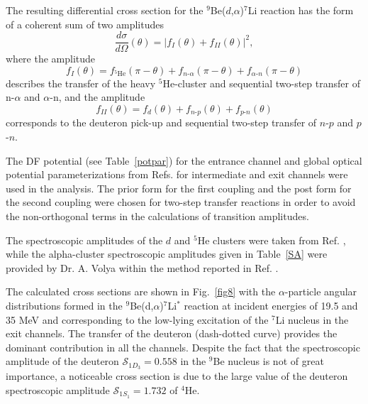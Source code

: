 \documentclass[
11pt, %
english, %
onehalfspacing, %
headsepline, %
]{MastersDoctoralThesis} %
\begin{document}
The resulting differential cross section for the ${^9}$Be($d$,$\alpha$)${}^7$Li reaction has the form of a coherent sum of two amplitudes
\begin{equation}
\frac{d\sigma}{d\Omega}(\theta) =\vert f_{I}(\theta) + f_{II}(\theta) \vert ^2,
\end{equation}
where the amplitude
\begin{equation} \label{eq:ampl1}
f_{I}(\theta)=f_{{}^5\textrm{He}}(\pi - \theta) + f_{n\textrm{-}\alpha}(\pi - \theta) + f_{\alpha\textrm{-}n}(\pi - \theta)
\end{equation}
describes the transfer of the heavy ${}^5$He-cluster and sequential two-step transfer of n-$\alpha$ and $\alpha$-n, and the amplitude
\begin{equation} \label{eq:ampl2}
f_{II}(\theta)=f_{d}(\theta) + f_{n\textrm{-}p}( \theta) + f_{p\textrm{-}n}(\theta)
\end{equation}
corresponds to the deuteron pick-up and sequential two-step transfer of $n$-$p$ and $p$-$n$.



The DF potential (see Table~\ref{potpar}) for the entrance channel and global optical potential parameterizations from Refs. \cite{globalTriton, globalAlpha, global6Li} for intermediate and exit channels were used in the analysis.
The prior form for the first coupling and the post form for the second coupling were chosen for two-step transfer reactions in order to avoid the non-orthogonal terms in the calculations of transition amplitudes.

The spectroscopic amplitudes of the $d$ and ${}^5$He clusters were taken from Ref. \cite{fiveSA}, while the alpha-cluster spectroscopic amplitudes given in Table~\ref{SA} were provided by Dr. A. Volya within the method reported in Ref. \cite{volya2017}.

The calculated cross sections are shown in Fig.~\ref{fig8} with the $\alpha$-particle angular distributions formed in the ${}^9$Be(d,$\alpha$)${}^7$Li$^*$ reaction at incident energies of 19.5 and 35 MeV and corresponding to the low-lying excitation of the ${}^7$Li nucleus in the exit channels. The transfer of the deuteron (dash-dotted curve) provides the dominant contribution in all the channels. Despite the fact that the spectroscopic amplitude of the deuteron $\mathcal{S}_{1{D}_3}=0.558$ in the ${}^9$Be nucleus is not of great importance, a noticeable cross section is due to the large value of the deuteron spectroscopic amplitude $\mathcal{S}_{1{S}_1}=1.732$  of ${}^4$He.
\end{document}
